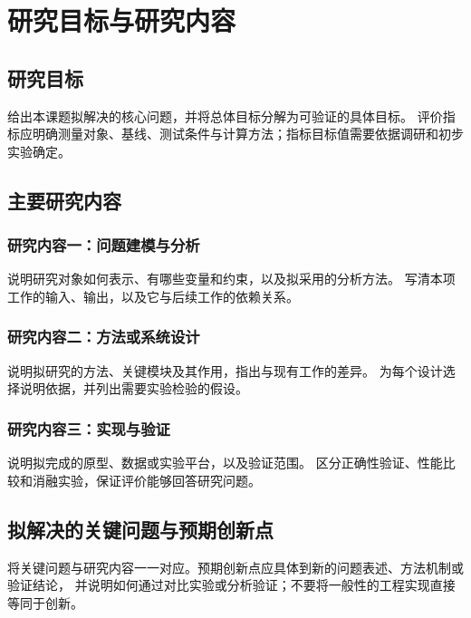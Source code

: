 \chapter{研究目标与研究内容}

\section{研究目标}
给出本课题拟解决的核心问题，并将总体目标分解为可验证的具体目标。
评价指标应明确测量对象、基线、测试条件与计算方法；指标目标值需要依据调研和初步实验确定。

\section{主要研究内容}
\subsection{研究内容一：问题建模与分析}
说明研究对象如何表示、有哪些变量和约束，以及拟采用的分析方法。
写清本项工作的输入、输出，以及它与后续工作的依赖关系。

\subsection{研究内容二：方法或系统设计}
说明拟研究的方法、关键模块及其作用，指出与现有工作的差异。
为每个设计选择说明依据，并列出需要实验检验的假设。

\subsection{研究内容三：实现与验证}
说明拟完成的原型、数据或实验平台，以及验证范围。
区分正确性验证、性能比较和消融实验，保证评价能够回答研究问题。

\section{拟解决的关键问题与预期创新点}
将关键问题与研究内容一一对应。预期创新点应具体到新的问题表述、方法机制或验证结论，
并说明如何通过对比实验或分析验证；不要将一般性的工程实现直接等同于创新。
